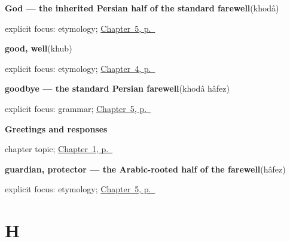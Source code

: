 \noindent\begin{minipage}[t]{\linewidth}
\raggedright
\textbf{God — the inherited Persian half of the standard farewell}\enspace\emph{}\enspace(khodâ)\par
\footnotesize explicit focus: etymology; \hyperref[ch:fa-take-leave]{Chapter~5, p.~\pageref*{ch:fa-take-leave}}
\end{minipage}\par\smallskip

\noindent\begin{minipage}[t]{\linewidth}
\raggedright
\textbf{good, well}\enspace\emph{}\enspace(khub)\par
\footnotesize explicit focus: etymology; \hyperref[ch:fa-how-are-you]{Chapter~4, p.~\pageref*{ch:fa-how-are-you}}
\end{minipage}\par\smallskip

\noindent\begin{minipage}[t]{\linewidth}
\raggedright
\textbf{goodbye — the standard Persian farewell}\enspace\emph{}\enspace(khodâ hâfez)\par
\footnotesize explicit focus: grammar; \hyperref[ch:fa-take-leave]{Chapter~5, p.~\pageref*{ch:fa-take-leave}}
\end{minipage}\par\smallskip

\noindent\begin{minipage}[t]{\linewidth}
\raggedright
\textbf{Greetings and responses}\par
\footnotesize chapter topic; \hyperref[ch:persian-greetings]{Chapter~1, p.~\pageref*{ch:persian-greetings}}
\end{minipage}\par\smallskip

\noindent\begin{minipage}[t]{\linewidth}
\raggedright
\textbf{guardian, protector — the Arabic-rooted half of the farewell}\enspace\emph{}\enspace(hâfez)\par
\footnotesize explicit focus: etymology; \hyperref[ch:fa-take-leave]{Chapter~5, p.~\pageref*{ch:fa-take-leave}}
\end{minipage}\par\smallskip

\section*{H}

